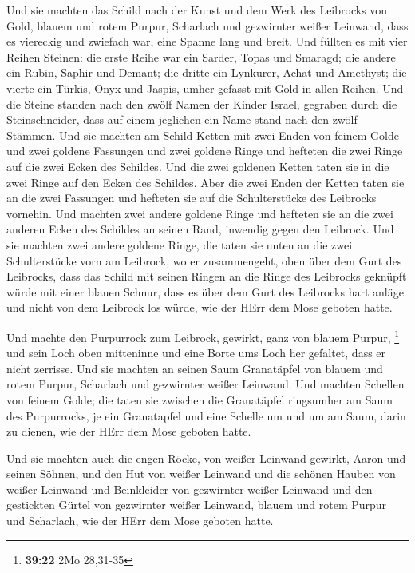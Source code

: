  Und sie machten das Schild nach der Kunst und dem Werk des
Leibrocks von Gold, blauem und rotem Purpur, Scharlach und gezwirnter
weißer Leinwand,  dass es viereckig und zwiefach war, eine
Spanne lang und breit.  Und füllten es mit vier Reihen
Steinen: die erste Reihe war ein Sarder, Topas und Smaragd;
 die andere ein Rubin, Saphir und Demant;  die
dritte ein Lynkurer, Achat und Amethyst;  die vierte ein
Türkis, Onyx und Jaspis, umher gefasst mit Gold in allen Reihen.
 Und die Steine standen nach den zwölf Namen der Kinder
Israel, gegraben durch die Steinschneider, dass auf einem jeglichen ein
Name stand nach den zwölf Stämmen.  Und sie machten am
Schild Ketten mit zwei Enden von feinem Golde  und zwei
goldene Fassungen und zwei goldene Ringe und hefteten die zwei Ringe auf
die zwei Ecken des Schildes.  Und die zwei goldenen Ketten
taten sie in die zwei Ringe auf den Ecken des Schildes. 
Aber die zwei Enden der Ketten taten sie an die zwei Fassungen und
hefteten sie auf die Schulterstücke des Leibrocks vornehin.
 Und machten zwei andere goldene Ringe und hefteten sie an
die zwei anderen Ecken des Schildes an seinen Rand, inwendig gegen den
Leibrock.  Und sie machten zwei andere goldene Ringe, die
taten sie unten an die zwei Schulterstücke vorn am Leibrock, wo er
zusammengeht, oben über dem Gurt des Leibrocks,  dass das
Schild mit seinen Ringen an die Ringe des Leibrocks geknüpft würde mit
einer blauen Schnur, dass es über dem Gurt des Leibrocks hart anläge und
nicht von dem Leibrock los würde, wie der HErr dem Mose geboten hatte.

 Und machte den Purpurrock zum Leibrock, gewirkt, ganz von
blauem Purpur, \footnote{\textbf{39:22} 2Mo 28,31-35}  und
sein Loch oben mitteninne und eine Borte ums Loch her gefaltet, dass er
nicht zerrisse.  Und sie machten an seinen Saum Granatäpfel
von blauem und rotem Purpur, Scharlach und gezwirnter weißer Leinwand.
 Und machten Schellen von feinem Golde; die taten sie
zwischen die Granatäpfel ringsumher am Saum des Purpurrocks,
 je ein Granatapfel und eine Schelle um und um am Saum,
darin zu dienen, wie der HErr dem Mose geboten hatte.

 Und sie machten auch die engen Röcke, von weißer Leinwand
gewirkt, Aaron und seinen Söhnen,  und den Hut von weißer
Leinwand und die schönen Hauben von weißer Leinwand und Beinkleider von
gezwirnter weißer Leinwand  und den gestickten Gürtel von
gezwirnter weißer Leinwand, blauem und rotem Purpur und Scharlach, wie
der HErr dem Mose geboten hatte.

